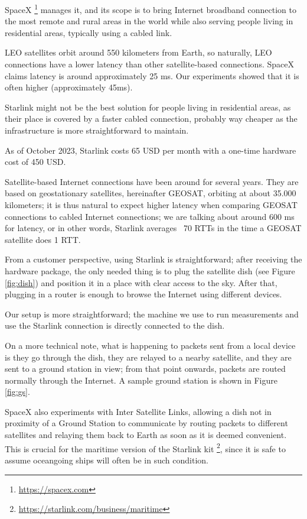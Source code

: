 \documentclass[IN,11pt,twoside,openright,idp,english]{tumthesis}
\begin{document}
SpaceX \footnote{\url{https://spacex.com}} manages it, and its scope is to bring Internet broadband connection to the most remote and rural areas in the world while also serving people living in residential areas, typically using a cabled link.
    
LEO satellites orbit around 550 kilometers from Earth, so naturally, LEO connections have a lower latency than other satellite-based connections. SpaceX claims latency is around approximately 25 ms. Our experiments showed that it is often higher (approximately 45ms). 
    
Starlink might not be the best solution for people living in residential areas, as their place is covered by a faster cabled connection, probably way cheaper as the infrastructure is more straightforward to maintain. 
    
As of October 2023, Starlink costs 65 USD per month with a one-time hardware cost of 450 USD. 
    
Satellite-based Internet connections have been around for several years. They are based on geostationary satellites, hereinafter GEOSAT, orbiting at about 35.000 kilometers; it is thus natural to expect higher latency when comparing GEOSAT connections to cabled Internet connections; we are talking about around 600 ms for latency, or in other words, Starlink averages ~70 RTTs in the time a GEOSAT satellite does 1 RTT.
    
From a customer perspective, using Starlink is straightforward; after receiving the hardware package, the only needed thing is to plug the satellite dish (see Figure \ref{fig:dish}) and position it in a place with clear access to the sky. After that, plugging in a router is enough to browse the Internet using different devices. 

Our setup is more straightforward; the machine we use to run measurements and use the Starlink connection is directly connected to the dish.
    
On a more technical note, what is happening to packets sent from a local device is they go through the dish, they are relayed to a nearby satellite, and they are sent to a ground station in view; from that point onwards, packets are routed normally through the Internet. A sample ground station is shown in Figure \ref{fig:gs}.
    
SpaceX also experiments with Inter Satellite Links, allowing a dish not in proximity of a Ground Station to communicate by routing packets to different satellites and relaying them back to Earth as soon as it is deemed convenient. This is crucial for the maritime version of the Starlink kit \footnote{\url{https://starlink.com/business/maritime}}, since it is safe to assume oceangoing ships will often be in such condition.
\end{document}
